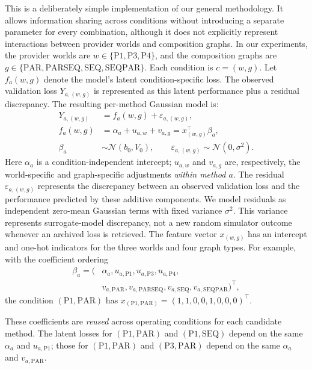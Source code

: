 \documentclass[10pt,a4paper]{article}
\begin{document}
This is a deliberately simple implementation of our general methodology. It allows information sharing across conditions without introducing a separate parameter for every combination, although it does not explicitly represent interactions between provider worlds and composition graphs. In our experiments, the provider worlds are $w\in\{\mathrm{P1},\mathrm{P3},\mathrm{P4}\}$, and the composition graphs are $g\in\{\mathrm{PAR},\mathrm{PARSEQ},\mathrm{SEQ},\mathrm{SEQPAR}\}$. Each condition is $c=(w,g)$. Let $f_a(w,g)$ denote the model's latent condition-specific loss. The observed validation loss $Y_{a,(w,g)}$ is represented as this latent performance plus a residual discrepancy. The resulting per-method Gaussian model is:
\begin{equation}
\begin{aligned}
Y_{a,(w,g)}&=f_a(w,g)+\varepsilon_{a,(w,g)},\\
f_a(w,g)&=\alpha_a+u_{a,w}+v_{a,g}
 =x_{(w,g)}^\top\beta_a,\\
\beta_a&\sim\mathcal{N}(b_0,V_0),\qquad
\varepsilon_{a,(w,g)}\sim\mathcal{N}(0,\sigma^2).
\end{aligned}
\label{eq:gaussianmodel}
\end{equation}
Here $\alpha_a$ is a condition-independent intercept; $u_{a,w}$ and $v_{a,g}$ are, respectively, the world-specific and graph-specific adjustments \emph{within method $a$}. The residual $\varepsilon_{a,(w,g)}$ represents the discrepancy between an observed validation loss and the performance predicted by these additive components. We model residuals as independent zero-mean Gaussian terms with fixed variance $\sigma^2$. This variance represents surrogate-model discrepancy, not a new random simulator outcome whenever an archived loss is retrieved. The feature vector $x_{(w,g)}$ has an intercept and one-hot indicators for the three worlds and four graph types. For example, with the coefficient ordering
\[
\begin{aligned}
\beta_a=\bigl(&\alpha_a,u_{a,\mathrm{P1}},u_{a,\mathrm{P3}},
u_{a,\mathrm{P4}},\\[-2pt]
&v_{a,\mathrm{PAR}},v_{a,\mathrm{PARSEQ}},
v_{a,\mathrm{SEQ}},v_{a,\mathrm{SEQPAR}}\bigr)^\top,
\end{aligned}
\]
the condition $(\mathrm{P1},\mathrm{PAR})$ has
$x_{(\mathrm{P1},\mathrm{PAR})}=(1,1,0,0,1,0,0,0)^\top$.

These coefficients are \emph{reused} across operating conditions for each candidate method. The latent losses for $(\mathrm{P1},\mathrm{PAR})$ and $(\mathrm{P1},\mathrm{SEQ})$ depend on the same $\alpha_a$ and $u_{a,\mathrm{P1}}$; those for $(\mathrm{P1},\mathrm{PAR})$ and $(\mathrm{P3},\mathrm{PAR})$ depend on the same $\alpha_a$ and $v_{a,\mathrm{PAR}}$.
\end{document}
